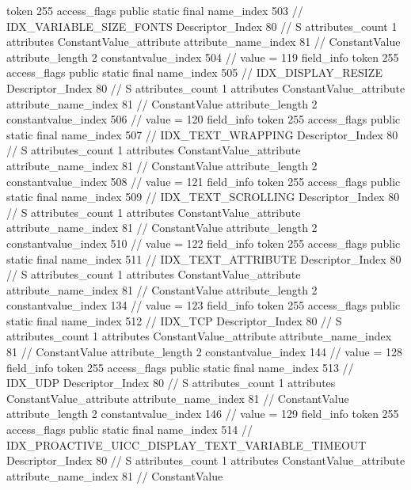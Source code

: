 {{{{{				token	255
				access_flags	public static final
				name_index	503		// IDX_VARIABLE_SIZE_FONTS
				Descriptor_Index	80		// S
				attributes_count	1
				attributes {
				ConstantValue_attribute {
					attribute_name_index	81		// ConstantValue
					attribute_length	2
					constantvalue_index	504		// value = 119
				}
				}
			}
			field_info {
				token	255
				access_flags	public static final
				name_index	505		// IDX_DISPLAY_RESIZE
				Descriptor_Index	80		// S
				attributes_count	1
				attributes {
				ConstantValue_attribute {
					attribute_name_index	81		// ConstantValue
					attribute_length	2
					constantvalue_index	506		// value = 120
				}
				}
			}
			field_info {
				token	255
				access_flags	public static final
				name_index	507		// IDX_TEXT_WRAPPING
				Descriptor_Index	80		// S
				attributes_count	1
				attributes {
				ConstantValue_attribute {
					attribute_name_index	81		// ConstantValue
					attribute_length	2
					constantvalue_index	508		// value = 121
				}
				}
			}
			field_info {
				token	255
				access_flags	public static final
				name_index	509		// IDX_TEXT_SCROLLING
				Descriptor_Index	80		// S
				attributes_count	1
				attributes {
				ConstantValue_attribute {
					attribute_name_index	81		// ConstantValue
					attribute_length	2
					constantvalue_index	510		// value = 122
				}
				}
			}
			field_info {
				token	255
				access_flags	public static final
				name_index	511		// IDX_TEXT_ATTRIBUTE
				Descriptor_Index	80		// S
				attributes_count	1
				attributes {
				ConstantValue_attribute {
					attribute_name_index	81		// ConstantValue
					attribute_length	2
					constantvalue_index	134		// value = 123
				}
				}
			}
			field_info {
				token	255
				access_flags	public static final
				name_index	512		// IDX_TCP
				Descriptor_Index	80		// S
				attributes_count	1
				attributes {
				ConstantValue_attribute {
					attribute_name_index	81		// ConstantValue
					attribute_length	2
					constantvalue_index	144		// value = 128
				}
				}
			}
			field_info {
				token	255
				access_flags	public static final
				name_index	513		// IDX_UDP
				Descriptor_Index	80		// S
				attributes_count	1
				attributes {
				ConstantValue_attribute {
					attribute_name_index	81		// ConstantValue
					attribute_length	2
					constantvalue_index	146		// value = 129
				}
				}
			}
			field_info {
				token	255
				access_flags	public static final
				name_index	514		// IDX_PROACTIVE_UICC_DISPLAY_TEXT_VARIABLE_TIMEOUT
				Descriptor_Index	80		// S
				attributes_count	1
				attributes {
				ConstantValue_attribute {
					attribute_name_index	81		// ConstantValue
}}}}}}}
